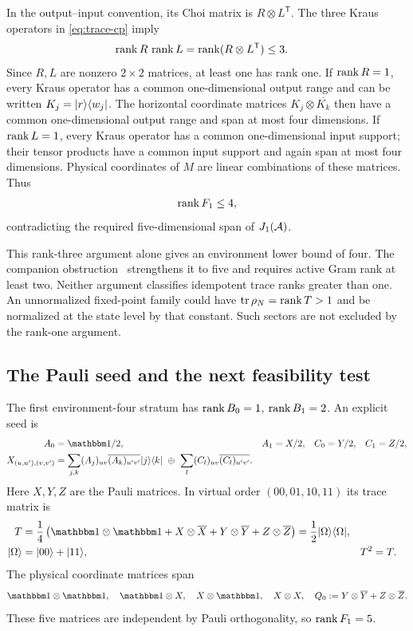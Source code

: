 \documentclass[aps,pra,reprint,nofootinbib,onecolumn]{revtex4-2}
\begin{document}
In the output--input convention, its Choi matrix is
$R\otimes L^{\mathsf T}$. The three Kraus operators in
\cref{eq:trace-cp} imply
\begin{align}
	\operatorname{rank} R\,\operatorname{rank} L
	 & =\operatorname{rank}(R\otimes L^{\mathsf T})\leq3.
\end{align}
Since $R,L$ are nonzero $2\times2$ matrices, at least one has rank one.
If $\operatorname{rank} R=1$, every Kraus operator has a common one-dimensional
output range and can be written $K_j=\lvert r\rangle\langle w_j\rvert$.
The horizontal coordinate matrices $K_j\otimes\overline{K_k}$
then have a common one-dimensional output range and span at most
four dimensions. If $\operatorname{rank} L=1$, every Kraus operator has a common
one-dimensional input support; their tensor products have a common
input support and again span at most four dimensions.
Physical coordinates of $M$ are linear combinations of these matrices.
Thus
\begin{align}
	\operatorname{rank} F_1\leq4,
\end{align}
contradicting the required five-dimensional span of $J_1(\mathcal{A})$.

This rank-three argument alone gives an environment lower bound of four.
The companion obstruction~\cite{EnvironmentFour} strengthens it to five
and requires active Gram rank at least two. Neither argument classifies
idempotent trace ranks greater than one. An unnormalized fixed-point family could have
$\operatorname{tr}\rho_N=\operatorname{rank} T>1$ and be normalized at the state level by that
constant. Such sectors are not excluded by the rank-one argument.

\subsection{The Pauli seed and the next feasibility test}

The first environment-four stratum has
$\operatorname{rank} B_0=1$, $\operatorname{rank} B_1=2$. An explicit seed is
\begin{align}
	A_0 & =\Id/2,                                      & A_1 & =X/2, & C_0 & =Y/2, & C_1 & =Z/2,
	\nonumber                                                                                    \\
	X_{(u,u'),(v,v')}
	    & =\sum_{j,k}(A_j)_{uv}\overline{(A_k)_{u'v'}}
	\ket j\bra k
	\ \oplus\
	\sum_l(C_l)_{uv}\overline{(C_l)_{u'v'}}.
	\label{eq:Pauli}
\end{align}
Here $X,Y,Z$ are the Pauli matrices. In virtual order
$(00,01,10,11)$ its trace matrix is
\begin{align}
	T            & =\frac14\left(\Id\otimes\Id+X\otimes\overline X
	+Y\otimes\overline Y+Z\otimes\overline Z\right)
	=\frac12\ket{\Omega}\bra{\Omega},
	\nonumber                                                        \\
	\ket{\Omega} & =\ket{00}+\ket{11},                             &
	T^2          & =T.
\end{align}
The physical coordinate matrices span
\begin{align}
	\Id\otimes\Id,\quad \Id\otimes X,\quad
	X\otimes\Id,\quad X\otimes X,\quad
	Q_0:=Y\otimes\overline Y+Z\otimes\overline Z.
	\label{eq:span-one}
\end{align}
These five matrices are independent by Pauli orthogonality, so
$\operatorname{rank} F_1=5$.
\end{document}
